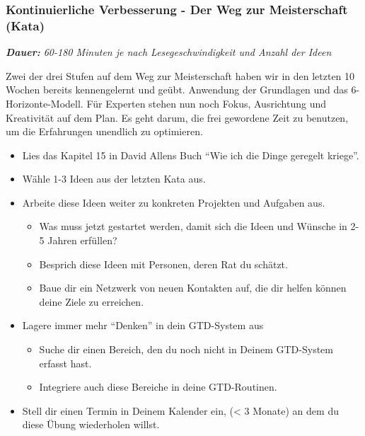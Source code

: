\documentclass[
  ngerman,
  paper=a4,
,captions=tableheading
]{scrartcl}
\providecommand{\tightlist}{%
  \setlength{\itemsep}{0pt}\setlength{\parskip}{0pt}}
\begin{document}
\hypertarget{kontinuierliche-verbesserung---der-weg-zur-meisterschaft-kata}{%
\subsubsection{Kontinuierliche Verbesserung - Der Weg zur Meisterschaft
(Kata)}\label{kontinuierliche-verbesserung---der-weg-zur-meisterschaft-kata}}

\emph{\textbf{Dauer:} 60-180 Minuten je nach Lesegeschwindigkeit und
Anzahl der Ideen}

Zwei der drei Stufen auf dem Weg zur Meisterschaft haben wir in den
letzten 10 Wochen bereits kennengelernt und geübt. Anwendung der
Grundlagen und das 6-Horizonte-Modell. Für Experten stehen nun noch
Fokus, Ausrichtung und Kreativität auf dem Plan. Es geht darum, die frei
gewordene Zeit zu benutzen, um die Erfahrungen unendlich zu optimieren.

\begin{itemize}
\tightlist
\item
  Lies das Kapitel 15 in David Allens Buch ``Wie ich die Dinge geregelt
  kriege''.
\item
  Wähle 1-3 Ideen aus der letzten Kata aus.
\item
  Arbeite diese Ideen weiter zu konkreten Projekten und Aufgaben aus.

  \begin{itemize}
  \tightlist
  \item
    Was muss jetzt gestartet werden, damit sich die Ideen und Wünsche in
    2-5 Jahren erfüllen?
  \item
    Besprich diese Ideen mit Personen, deren Rat du schätzt.
  \item
    Baue dir ein Netzwerk von neuen Kontakten auf, die dir helfen können
    deine Ziele zu erreichen.
  \end{itemize}
\item
  Lagere immer mehr ``Denken'' in dein GTD-System aus

  \begin{itemize}
  \tightlist
  \item
    Suche dir einen Bereich, den du noch nicht in Deinem GTD-System
    erfasst hast.
  \item
    Integriere auch diese Bereiche in deine GTD-Routinen.
  \end{itemize}
\item
  Stell dir einen Termin in Deinem Kalender ein, (\textless{} 3 Monate)
  an dem du diese Übung wiederholen willst.
\end{itemize}
\end{document}
